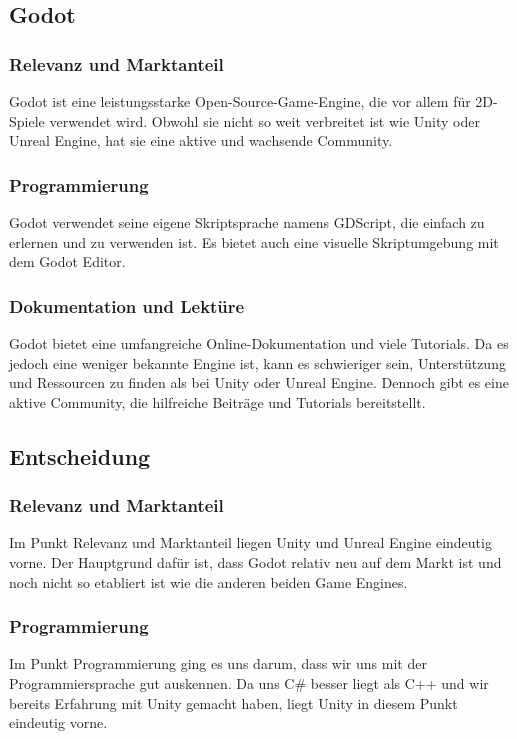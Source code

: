 \pagebreak

\subsection{Godot}
\subsubsection{Relevanz und Marktanteil}
Godot ist eine leistungsstarke Open-Source-Game-Engine, die vor allem für 2D-Spiele verwendet wird. Obwohl sie nicht so weit verbreitet ist wie Unity oder Unreal Engine, hat sie eine aktive und wachsende Community.

\subsubsection{Programmierung}
Godot verwendet seine eigene Skriptsprache namens GDScript, die einfach zu erlernen und zu verwenden ist. Es bietet auch eine visuelle Skriptumgebung mit dem Godot Editor.

\subsubsection{Dokumentation und Lektüre}
Godot bietet eine umfangreiche Online-Dokumentation und viele Tutorials. Da es jedoch eine weniger bekannte Engine ist, kann es schwieriger sein, Unterstützung und Ressourcen zu finden als bei Unity oder Unreal Engine. Dennoch gibt es eine aktive Community, die hilfreiche Beiträge und Tutorials bereitstellt.

\pagebreak

\subsection{Entscheidung}
\subsubsection{Relevanz und Marktanteil}
Im Punkt Relevanz und Marktanteil liegen Unity und Unreal Engine eindeutig vorne. Der Hauptgrund dafür ist, dass Godot relativ neu auf dem Markt ist und noch nicht so etabliert ist wie die anderen beiden Game Engines.

\subsubsection{Programmierung}
Im Punkt Programmierung ging es uns darum, dass wir uns mit der Programmiersprache gut auskennen. Da uns C\# besser liegt als C++ und wir bereits Erfahrung mit Unity gemacht haben, liegt Unity in diesem Punkt eindeutig vorne.

